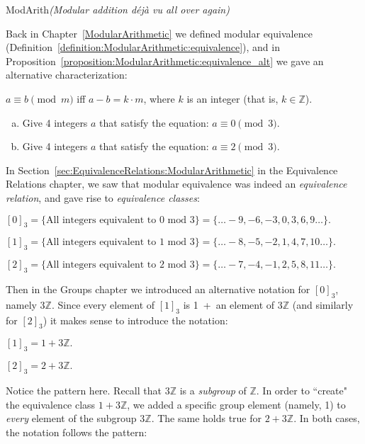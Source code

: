 \begin{example}{ModArith}\emph{(Modular addition d\'ej\`a vu all over again)}  

Back in Chapter~\ref{ModularArithmetic} we defined modular equivalence (Definition~\ref{definition:ModularArithmetic:equivalence}), and in Proposition~\ref{proposition:ModularArithmetic:equivalence_alt} we gave an alternative characterization:
\medskip

$a \equiv b \pmod{m}$ iff $a - b = k \cdot m$, where $k$ is an integer (that is, $k \in  {\mathbb Z}$). 
\medskip

\begin{exercise}{}
\begin{enumerate}[(a)]
\item
Give 4 integers $a$ that satisfy the equation: $a \equiv 0 \pmod{3}$.
\item
Give 4 integers $a$ that satisfy the equation: $a \equiv 2 \pmod{3}$.
\end{enumerate}
\end{exercise}

\noindent
In Section~\ref{sec:EquivalenceRelations:ModularArithmetic} in the Equivalence Relations chapter, we saw that modular equivalence was indeed an \emph{equivalence relation}, and  gave rise to \emph{equivalence classes}:
\medskip

$[0]_3  = \{\mbox{All integers equivalent to 0 mod 3}\} = \{ \ldots -9, -6, -3, 0, 3, 6, 9 \ldots \}.$

$[1]_3  = \{\mbox{All integers equivalent to 1 mod 3}\} = \{ \ldots -8, -5, -2, 1, 4, 7, 10 \ldots \}.$

$[2]_3  = \{\mbox{All integers equivalent to 2 mod 3}\} = \{ \ldots -7, -4, -1, 2, 5, 8, 11 \ldots \}.$
\medskip

\noindent
Then in the Groups chapter we introduced an alternative notation for $[0]_3$, namely $3{\mathbb Z}$. Since every element of  $[1]_3$ is 1~+~an element of $3{\mathbb Z}$ (and similarly for $[2]_3$)  it makes sense to introduce the notation:
\medskip

$[1]_3  = 1 + 3{\mathbb Z}.$

$[2]_3  = 2 + 3{\mathbb Z}.$
\medskip

\noindent
Notice the pattern here. Recall that $3{\mathbb Z}$ is a \emph{subgroup} of ${\mathbb Z}$. In order to ``create" the equivalence class $1 + 3{\mathbb Z}$, we added a specific group element (namely, 1) to \emph{every} element of the subgroup $3{\mathbb Z}$. The same holds true for $2 +  3{\mathbb Z}$. In both cases, the notation follows the pattern: 
\medskip


\end{example}
